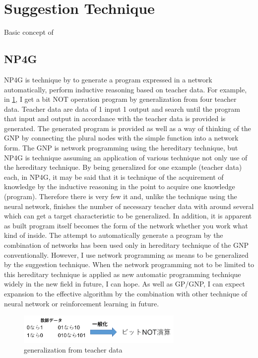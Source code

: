 \documentclass{article}
\begin{document}
\section {Suggestion Technique}
Basic concept of \subsection{NP4G}
NP4G is technique by to generate a program expressed in a network automatically, perform inductive reasoning based on teacher data.
For example, in \ref{fig:summary}, I get a bit NOT operation program by generalization from four teacher data.
Teacher data are data of 1 input 1 output and search until the program that input and output in accordance with the teacher data is provided is generated.
The generated program is provided as well as a way of thinking of the GNP by connecting the plural nodes with the simple function into a network form.
The GNP is network programming using the hereditary technique, but NP4G is technique assuming an application of various technique not only use of the hereditary technique.
By being generalized for one example (teacher data) each, in NP4G, it may be said that it is technique of the acquirement of knowledge by the inductive reasoning in the point to acquire one knowledge (program).
Therefore there is very few it and, unlike the technique using the neural network, finishes the number of necessary teacher data with around several which can get a target characteristic to be generalized.
In addition, it is apparent as built program itself becomes the form of the network whether you work what kind of inside.
The attempt to automatically generate a program by the combination of networks has been used only in hereditary technique of the GNP conventionally.
However, I use network programming as means to be generalized by the suggestion technique.
When the network programming not to be limited to this hereditary technique is applied as new automatic programming technique widely in the new field in future, I can hope.
As well as GP/GNP, I can expect expansion to the effective algorithm by the combination with other technique of neural network or reinforcement learning in future.
\begin{figure}[t]
\begin{center}
\includegraphics[width=80mm]{summary.png}
\end{center}
\caption {generalization from teacher data}
\label{fig:summary}
\end{figure}
\end{document}
